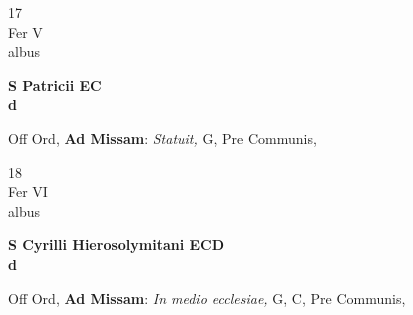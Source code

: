 \documentclass[10pt, openany]{book}
\begin{document}
        \begin{center}
            \begin{minipage}{3.5in}
                \vspace{2em}
                \begin{minipage}{0.5in}
                    {\Huge 17} \\
                    {\normalsize Fer V} \\
                    {\normalsize albus}
                \end{minipage}
                \begin{minipage}{3.0in}
                    \textbf{ \large S Patricii EC \\
                    \textnormal{\normalsize d}} \\ 
                \end{minipage}
                \begin{justify}Off Ord, \textbf{Ad Missam}: \textit{Statuit,} G, Pre Communis,   
                \end{justify}
            \end{minipage}
        \end{center}
    
        \begin{center}
            \begin{minipage}{3.5in}
                \vspace{2em}
                \begin{minipage}{0.5in}
                    {\Huge 18} \\
                    {\normalsize Fer VI} \\
                    {\normalsize albus}
                \end{minipage}
                \begin{minipage}{3.0in}
                    \textbf{ \large S Cyrilli Hierosolymitani ECD \\
                    \textnormal{\normalsize d}} \\ 
                \end{minipage}
                \begin{justify}Off Ord, \textbf{Ad Missam}: \textit{In medio ecclesiae,} G, C, Pre Communis,   
                \end{justify}
            \end{minipage}
        \end{center}
    
\end{document}
